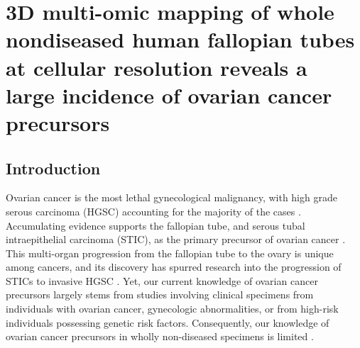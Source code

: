 \chapter{3D multi-omic mapping of whole nondiseased human fallopian tubes at cellular resolution reveals a large incidence of ovarian cancer precursors} \label{chap:chap-3}
\begin{refsection}
    
    \section{Introduction}
    Ovarian cancer is the most lethal gynecological malignancy, with high grade serous carcinoma (HGSC) accounting for the majority of the cases \cite{Bowtell2015Rethinking,Kurman2016Dualistic,Patch2015Wholegenome,Lisio2019High, Kim2018Cell, Shih2021Origin}. Accumulating evidence supports the fallopian tube, and serous tubal intraepithelial carcinoma (STIC), as the primary precursor of ovarian cancer \cite{Shih2021Origin,Kindelberger2007Intraepithelial,Folkins2008candidate, Kurman2010Origin,Carlson2010Serous,Erickson2013role, Piek2001Dysplastic, Labidi2017High, Wu2019Genomic, Kuhn2012TP53}. This multi-organ progression from the fallopian tube to the ovary is unique among cancers, and its discovery has spurred research into the progression of STICs to invasive HGSC \cite{Labidi2017High,Zhang2019Both,McDaniel2015Next,Anand2021Single, Wang2022Spatial, Wang2024Aneuploidy,Pisanic2020Methylomic}. Yet, our current knowledge of ovarian cancer precursors largely stems from studies involving clinical specimens from individuals with ovarian cancer, gynecologic abnormalities, or from high-risk individuals possessing genetic risk factors\cite{Kurman2008Pathogenesis,Liberto2022Current,Jones2017Genetic,Kauff2002Risk}. Consequently, our knowledge of ovarian cancer precursors in wholly non-diseased specimens is limited \cite{Eckert2016Genomics,Kuchenbaecker2017Risks,Collins2011tubal,Chambers2022Is}.

\end{refsection}
